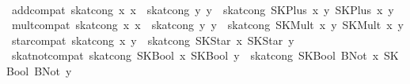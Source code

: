 \begin{isabellebody}
\isanewline
\ \ \isanewline
{}\ add{}compat{}\ {}skat{}cong\ x{}\ x{}\ {}\ skat{}cong\ y{}\ y{}\ {}\ skat{}cong\ {}SKPlus\ x{}\ y{}{}\ {}SKPlus\ x{}\ y{}{}{}\isanewline
{}\ mult{}compat{}\ {}skat{}cong\ x{}\ x{}\ {}\ skat{}cong\ y{}\ y{}\ {}\ skat{}cong\ {}SKMult\ x{}\ y{}{}\ {}SKMult\ x{}\ y{}{}{}\isanewline
{}\ star{}compat{}\ {}skat{}cong\ x\ y\ {}\ skat{}cong\ {}SKStar\ x{}\ {}SKStar\ y{}{}\isanewline
{}\ skat{}not{}compat{}\ {}skat{}cong\ {}SKBool\ x{}\ {}SKBool\ y{}\ {}\ skat{}cong\ {}SKBool\ {}BNot\ x{}{}\ {}SKBool\ {}BNot\ y{}{}{}\isanewline

\end{isabellebody}
